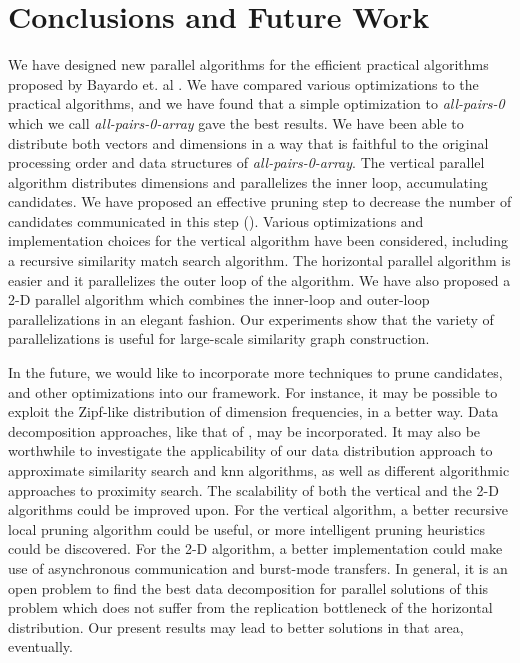 \documentclass{comjnl}
\newcommand{\var}[1]{\mbox{\textsl{#1}}} %
\begin{document}



\section{Conclusions and Future Work}
\label{sec:conclusion}

We have designed new parallel algorithms for the efficient practical
algorithms proposed by Bayardo et. al \cite{Bayardo2007Scaling}. We
have compared various optimizations to the practical algorithms, and
we have found that a simple optimization to \var{all-pairs-0} which we call
\var{all-pairs-0-array} gave the best results. We have been able to
distribute both vectors and dimensions in a way that is faithful to
the original processing order and data structures of
\var{all-pairs-0-array}. The vertical parallel algorithm distributes
dimensions and parallelizes the inner loop, accumulating
candidates. We have proposed an effective pruning step to decrease the
number of candidates communicated in this step
(). Various optimizations and
implementation choices for the vertical algorithm have been
considered, including a recursive similarity match search
algorithm. The horizontal parallel algorithm is easier and it
parallelizes the outer loop of the algorithm. We have also proposed a
2-D parallel algorithm which combines the inner-loop and outer-loop
parallelizations in an elegant fashion. Our experiments show that the
variety of parallelizations is useful for large-scale similarity graph
construction.

In the future, we would like to incorporate more
techniques to prune candidates, and other optimizations into our
framework. For instance, it may be possible to exploit the Zipf-like
distribution of dimension frequencies, in a better way. 
Data decomposition approaches, like that of \cite{kulkarni06}, may be
incorporated. It may also be worthwhile to investigate the
applicability of our data distribution approach to approximate
similarity search and knn algorithms, as well as different algorithmic
approaches to proximity search. The scalability of both the vertical
and the 2-D algorithms could be improved upon. For the vertical
algorithm, a better recursive local pruning algorithm could be useful,
or more intelligent pruning heuristics could be discovered. For the
2-D algorithm, a better implementation could make use of asynchronous
communication and burst-mode transfers. In general, it is an open
problem to find the best data decomposition for parallel solutions of
this problem which does not suffer from the replication bottleneck of
the horizontal distribution. Our present results may lead to better
solutions in that area, eventually.

% 
 
\end{document}
